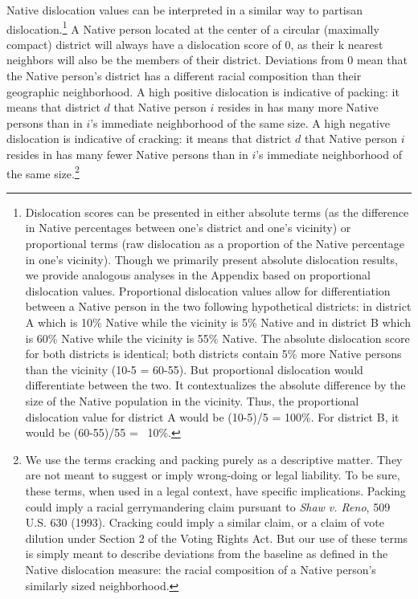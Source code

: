 \documentclass[12pt]{article}
\begin{document}
Native dislocation values can be interpreted in a similar way to partisan dislocation.\footnote{Dislocation scores can be presented in either absolute terms (as the difference in Native percentages between one's district and one's vicinity) or proportional terms (raw dislocation as a proportion of the Native percentage in one's vicinity).  Though we primarily present absolute dislocation results, we provide analogous analyses in the Appendix based on proportional dislocation values.  Proportional dislocation values allow for differentiation between a Native person in the two following hypothetical districts: in district A which is 10\% Native while the vicinity is 5\% Native and in district B which is 60\% Native while the vicinity is 55\% Native.  The absolute dislocation score for both districts is identical; both districts contain 5\% more Native persons than the vicinity (10-5 = 60-55).  But proportional dislocation would differentiate between the two.  It contextualizes the absolute difference by the size of the Native population in the vicinity.  Thus, the proportional dislocation value for district A would be (10-5)/5 = 100\%.  For district B, it would be (60-55)/55 = ~10\%.} A Native person located at the center of a circular (maximally compact) district will always have a dislocation score of 0, as their k nearest neighbors will also be the members of their district. Deviations from 0 mean that the Native person's district has a different racial composition than their geographic neighborhood. A high positive dislocation is indicative of packing: it means that district $d$ that Native person $i$ resides in has many more Native persons than in $i$'s immediate neighborhood of the same size. A high negative dislocation is indicative of cracking: it means that district $d$ that Native person $i$ resides in has many fewer Native persons than in $i$'s immediate neighborhood of the same size.\footnote{We use the terms cracking and packing purely as a descriptive matter.  They are not meant to suggest or imply wrong-doing or legal liability. To be sure, these terms, when used in a legal context, have specific implications.  Packing could imply a racial gerrymandering claim pursuant to \textit{Shaw v. Reno}, 509 U.S. 630 (1993). Cracking could imply a similar claim, or a claim of vote dilution under Section 2 of the Voting Rights Act. But our use of these terms is simply meant to describe deviations from the baseline as defined in the Native dislocation measure: the racial composition of a Native person's similarly sized neighborhood.}
\end{document}
